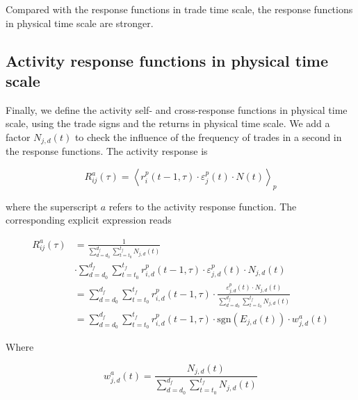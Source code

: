 Compared with the response functions in trade time scale, the response functions
in physical time scale are stronger.

\subsection{Activity response functions in physical time scale}
\label{subsec:activity_response_function}

Finally, we define the activity self- and cross-response functions in physical
time scale, using the trade signs and the returns in physical time scale.
We add a factor $N_{j,d} \left(t \right)$ to check the influence of the
frequency of trades in a second in the response functions. The activity
response is

\begin{equation}\label{eq:activity_response_functions_general}
    R^{a}_{ij}\left(\tau\right)=\left\langle r^{p}_{i}\left(t-1, \tau\right)
    \cdot\varepsilon_{j}^{p} \left(t\right) \cdot N \left(t \right)
    \right\rangle _{p}
\end{equation}

where the superscript $a$ refers to the activity response function. The
corresponding explicit expression reads

\begin{align}
    R_{ij}^{a}\left(\tau\right)&=\frac{1}{\sum_{d=d_{0}}^{d_{f}}
    \sum_{t=t_{0}}^{t_{f}}N_{j,d} \left(t\right)} \nonumber \\
    &\cdot\sum_{d=d_{0}}^{d_{f}}\sum_{t=t_{0}}^{t_{f}}r^{p}_{i,d}
    \left(t-1,\tau\right) \cdot\varepsilon_{j,d}^{p}\left(t\right)\cdot N_{j,d}
    \left(t\right)\\
    &=\sum_{d=d_{0}}^{d_{f}} \sum_{t=t_{0}}^{t_{f}}r^{p}_{i,d}
    \left(t-1,\tau\right) \cdot\frac{\varepsilon_{j,d}^{p}\left(t \right)
    \cdot N_{j,d}\left(t\right)} {\sum_{d=d_{0}}^{d_{f}}\sum_{t=t_{0}}^{t_{f}}
    N_{j,d}\left(t \right)} \nonumber \\
    &=\sum_{d=d_{0}}^{d_{f}} \sum_{t=t_{0}}^{t_{f}}r^{p}_{i,d}
    \left(t-1,\tau\right) \cdot\text{sgn}\left(E_{j,d}\left(t\right)\right)
    \cdot w_{j,d}^{a}\left(t\right)
\end{align}

Where

\begin{equation}
    w_{j,d}^{a}\left(t\right) = \frac{N_{j,d}\left(t \right)}
    {\sum_{d=d_{0}}^{d_{f}}\sum_{t=t_{0}}^{t_{f}}N_{j,d}\left(t\right)}
\end{equation}

